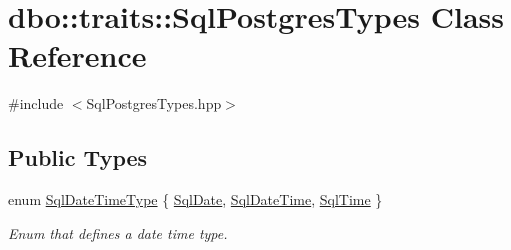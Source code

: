 \hypertarget{classdbo_1_1traits_1_1_sql_postgres_types}{\section{dbo\+:\+:traits\+:\+:Sql\+Postgres\+Types Class Reference}
\label{classdbo_1_1traits_1_1_sql_postgres_types}
}


{\ttfamily \#include $<$Sql\+Postgres\+Types.\+hpp$>$}

\subsection*{Public Types}
\begin{DoxyCompactItemize}
\item 
enum \hyperlink{classdbo_1_1traits_1_1_sql_postgres_types_ae4fe0e8ccef92e4330e470f407cabdea}{Sql\+Date\+Time\+Type} \{ \hyperlink{classdbo_1_1traits_1_1_sql_postgres_types_ae4fe0e8ccef92e4330e470f407cabdeaa522bb3ef71e99ebd0a0d7d806a5ac1d2}{Sql\+Date}, 
\hyperlink{classdbo_1_1traits_1_1_sql_postgres_types_ae4fe0e8ccef92e4330e470f407cabdeaac77f9a3f600090ebe2a9a3703340d5e5}{Sql\+Date\+Time}, 
\hyperlink{classdbo_1_1traits_1_1_sql_postgres_types_ae4fe0e8ccef92e4330e470f407cabdeaa9a7e92cc00af10d80e981f862e67964d}{Sql\+Time}
 \}
\begin{DoxyCompactList}\small\item\em Enum that defines a date time type. \end{DoxyCompactList}\end{DoxyCompactItemize}
